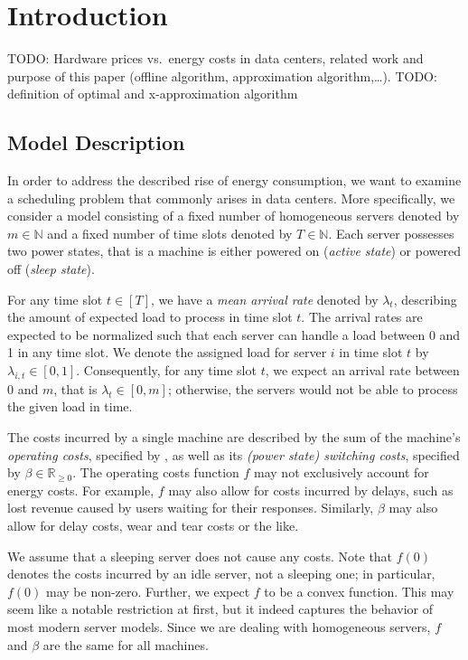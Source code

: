 
\chapter{Introduction}
TODO: Hardware prices vs.\ energy costs in data centers, related work and purpose of this paper (offline algorithm, approximation algorithm,\ldots).
TODO: definition of optimal and x-approximation algorithm

\section{Model Description}\label{sec:model_descr}
In order to address the described rise of energy consumption, we want to examine a scheduling problem that commonly arises in data centers. More specifically, we consider a model consisting of a fixed number of homogeneous servers denoted by $m\in\mathbb{N}$ and a fixed number of time slots denoted by $T\in\mathbb{N}$. Each server possesses two power states, that is a machine is either powered on (\emph{active state}) or powered off (\emph{sleep state}).
	
For any time slot $t\in[T]$, we have a \emph{mean arrival rate} denoted by $\lambda_t$, describing the amount of expected load to process in time slot $t$. The arrival rates are expected to be normalized such that each server can handle a load between 0 and 1 in any time slot. We denote the assigned load for server $i$ in time slot $t$ by $\lambda_{i,t}\in[0,1]$. Consequently, for any time slot $t$, we expect an arrival rate between 0 and $m$, that is $\lambda_t\in[0,m]$; otherwise, the servers would not be able to process the given load in time.

The costs incurred by a single machine are described by the sum of the machine's \emph{operating costs}, specified by , as well as its \emph{(power state) switching costs}, specified by $\beta\in\mathbb{R}_{\ge 0}$. 
The operating costs function $f$ may not exclusively account for energy costs. For example, $f$ may also allow for costs incurred by delays, such as lost revenue caused by users waiting for their responses. Similarly, $\beta$ may also allow for delay costs, wear and tear costs or the like.\parencite{dyn-right-sizing}

We assume that a sleeping server does not cause any costs. Note that $f(0)$ denotes the costs incurred by an idle server, not a sleeping one; in particular, $f(0)$ may be non-zero. Further, we expect $f$ to be a convex function. This may seem like a notable restriction at first, but it indeed captures the behavior of most modern server models. Since we are dealing with homogeneous servers, $f$ and $\beta$ are the same for all machines.

